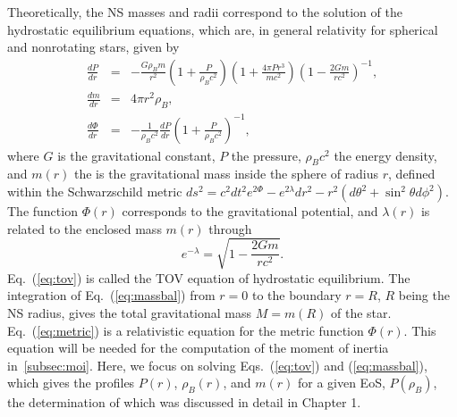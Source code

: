 Theoretically, the NS masses and radii correspond to the 
solution of the hydrostatic equilibrium equations, which are, in general 
relativity for spherical and nonrotating 
stars, given by~\cite{Tolman1939,Oppenheimer1939}
%
\begin{eqnarray}
  \frac{dP}{dr} &=& -\frac{G\rho_B m}{r^2}\left(1 + \frac{P}{\rho_B
  c^2}\right)\left(1+\frac{4\pi
  Pr^3}{mc^2}\right)\left(1-\frac{2Gm}{rc^2}\right)^{-1},\label{eq:tov}\\
      \frac{dm}{dr} &=& 4\pi r^2\rho_B,\label{eq:massbal}\\
  \frac{d\Phi}{dr} &=& -\frac{1}{\rho_B
    c^2}\frac{dP}{dr}\left(1+\frac{P}{\rho_B
  c^2}\right)^{-1}\label{eq:metric},
\end{eqnarray}
%
where $G$ is the gravitational constant, $P$ the pressure, $\rho_B c^2$ the
energy density, and $m(r)$ the is the gravitational mass inside the sphere of
radius $r$, defined within the Schwarzschild metric $ds^2 = c^2dt^2e^{2\Phi} 
- e^{2\lambda}dr^2 - r^2(d\theta^2 + \sin^2\theta d\phi^2)$. The function 
$\Phi(r)$ corresponds to the gravitational potential, and $\lambda(r)$ is 
related to the enclosed mass $m(r)$ through
%
\begin{equation}
  e^{-\lambda} = \sqrt{1-\frac{2Gm}{rc^2}}.
\end{equation}
%
Eq.~(\ref{eq:tov}) is called the TOV equation 
of hydrostatic equilibrium. The integration of Eq.~(\ref{eq:massbal}) from
$r=0$ to the boundary $r=R$, $R$ being the NS radius, gives the total
gravitational mass $M=m(R)$ of the star. Eq.~(\ref{eq:metric}) is a 
relativistic equation for the metric function $\Phi(r)$. This equation will be
needed for the computation of the moment of inertia in~\ref{subsec:moi}. Here, 
we focus on solving Eqs.~(\ref{eq:tov}) and 
(\ref{eq:massbal}), which gives the profiles $P(r)$, $\rho_B(r)$, and $m(r)$ 
for a given EoS, $P(\rho_B)$, the determination of which was discussed in 
detail in Chapter 1.

